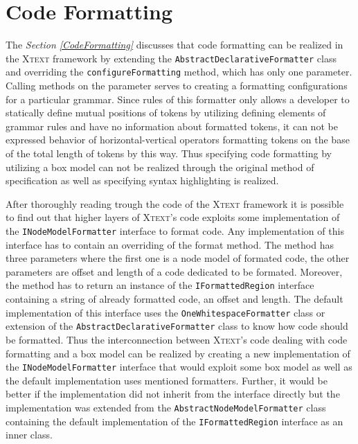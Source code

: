 \documentclass[12pt,notitlepage,a4paper]{report}
\begin{document}
\section{Code Formatting}
\label{CodeFormattingRealization}
The \textit{Section \ref{CodeFormatting}} discusses that code formatting can be realized in the \textsc{Xtext} framework by extending the \texttt{AbstractDeclarativeFormatter} class and overriding the \texttt{configureFormatting} method, which has only one parameter. Calling methods on the parameter serves to creating a formatting configurations for a particular grammar. Since rules of this formatter only allows a developer to statically define mutual positions of tokens by utilizing defining elements of grammar rules and have no information about formatted tokens, it can not be expressed behavior of horizontal-vertical operators formatting tokens on the base of the total length of tokens by this way. Thus  specifying code formatting by utilizing a box model can not be realized through the original method of specification as well as specifying syntax highlighting is realized.

After thoroughly reading trough the code of the \textsc{Xtext} framework it is possible to find out that higher layers of \textsc{Xtext}'s code exploits some implementation of the \texttt{INodeModelFormatter} interface to format code. Any implementation of this interface has to contain an overriding of the format method. The method has three parameters where the first one is  a node model of formated code, the other parameters are offset and length of a code dedicated to be formated. Moreover, the method has to return an instance of the \texttt{IFormattedRegion} interface containing a string of already formatted code, an offset and length. The default implementation of this interface uses the \texttt{OneWhitespaceFormatter} class or extension of the \texttt{AbstractDeclarativeFormatter} class to know how code should be formatted. Thus the interconnection between \textsc{Xtext}'s code dealing with code formatting and a box model can be realized by creating a new implementation of the \texttt{INodeModelFormatter} interface that would exploit some box model as well as the default implementation uses mentioned formatters. Further, it would be better if the implementation did not inherit from the interface directly but the implementation was extended from the \texttt{AbstractNodeModelFormatter} class containing the default implementation of the \texttt{IFormattedRegion} interface as an inner class.
\end{document}
